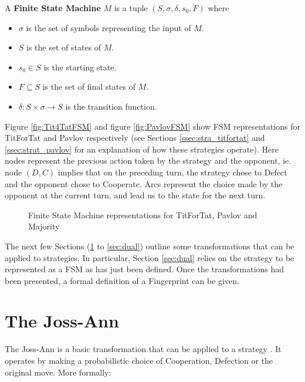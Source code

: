 \begin{definition}\label{def:fsm}
A \textbf{Finite State Machine} $M$ is a tuple $(S, \sigma, \delta, s_0, F)$ where
\begin{itemize}
 \item $\sigma$ is the set of symbols representing the input of $M$.
 \item $S$ is the set of states of $M$.
 \item $s_0 \in S$ is the starting state.
 \item $F \subseteq S$ is the set of final states of $M$.
 \item $\delta: S \times \sigma \rightarrow S$ is the transition function.
\end{itemize}
\end{definition}

Figure \ref{fig:Tit4TatFSM} and figure \ref{fig:PavlovFSM} show FSM representations for TitForTat and Pavlov respectively (see Sections \ref{ssec:stra_titfortat} and \ref{ssec:strat_pavlov} for an explanation of how these strategies operate).
Here nodes represent the previous action taken by the strategy and the opponent, ie. node $(D, C)$ implies that on the preceding turn, the strategy chose to Defect and the opponent chose to Cooperate.
Arcs represent the choice made by the opponent at the current turn, and lead us to the state for the next turn.

\begin{figure}[hbtp!]
\centering
{}
\caption{Finite State Machine representations for TitForTat, Pavlov and Majority}
\end{figure}

The next few Sections (\ref{sec:joss-ann} to \ref{sec:dual}) outline some transformations that can be applied to strategies.
In particular, Section \ref{sec:dual} relies on the strategy to be represented as a FSM as has just been defined.
Once the transformations had been presented, a formal definition of a Fingerprint can be given.



\section{The Joss-Ann}\label{sec:joss-ann}
The Joss-Ann is a basic transformation that can be applied to a strategy \cite{Ashlock2008, Ashlock2010, Ashlock2004,  Ashlock2005, Ashlock2009, Ashlock2006}.
It operates by making a probabilistic choice of Cooperation, Defection or the original move.
More formally:

